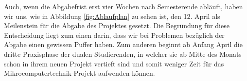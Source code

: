 Auch, wenn die Abgabefrist erst vier Wochen nach Semesterende abläuft, haben wir uns, wie in Abbildung \ref{fig:Ablaufplan} zu sehen ist, den 12. April als Meilenstein für die Abgabe des Projektes gesetzt. Die Begründung für diese Entscheidung liegt zum einen darin, dass wir bei Problemen bezüglich der Abgabe einen gewissen Puffer haben. Zum anderen beginnt ab Anfang April die dritte Praxisphase der dualen Studierenden, in welcher sie ab Mitte des Monats schon in ihrem neuen Projekt vertieft sind und somit weniger Zeit für das Mikrocomputertechnik-Projekt aufwenden können.